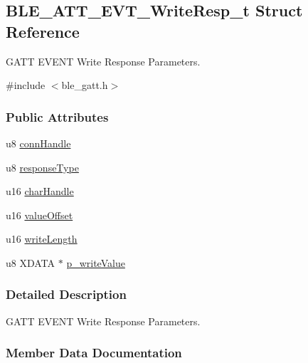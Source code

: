 \hypertarget{struct_b_l_e___a_t_t___e_v_t___write_resp__t}{}\subsection{B\+L\+E\+\_\+\+A\+T\+T\+\_\+\+E\+V\+T\+\_\+\+Write\+Resp\+\_\+t Struct Reference}
\label{struct_b_l_e___a_t_t___e_v_t___write_resp__t}


G\+A\+TT E\+V\+E\+NT Write Response Parameters.  




{\ttfamily \#include $<$ble\+\_\+gatt.\+h$>$}

\subsubsection*{Public Attributes}
\begin{DoxyCompactItemize}
\item 
u8 \hyperlink{struct_b_l_e___a_t_t___e_v_t___write_resp__t_a084e23c2f9ee7cbbad0306821f906643}{conn\+Handle}
\item 
u8 \hyperlink{struct_b_l_e___a_t_t___e_v_t___write_resp__t_a6908f020851f87349cfc09d97f877a8c}{response\+Type}
\item 
u16 \hyperlink{struct_b_l_e___a_t_t___e_v_t___write_resp__t_a85c97887446b1ba63322709cdd619e3b}{char\+Handle}
\item 
u16 \hyperlink{struct_b_l_e___a_t_t___e_v_t___write_resp__t_a95829606ee80fe5e91c03ac36b1fa49e}{value\+Offset}
\item 
u16 \hyperlink{struct_b_l_e___a_t_t___e_v_t___write_resp__t_a30b51eac221d63c08eb88275c2e82f9d}{write\+Length}
\item 
u8 X\+D\+A\+TA $\ast$ \hyperlink{struct_b_l_e___a_t_t___e_v_t___write_resp__t_aa4abed7b3086cee41d8c63cb12f29fa9}{p\+\_\+write\+Value}
\end{DoxyCompactItemize}


\subsubsection{Detailed Description}
G\+A\+TT E\+V\+E\+NT Write Response Parameters. 

\subsubsection{Member Data Documentation}
